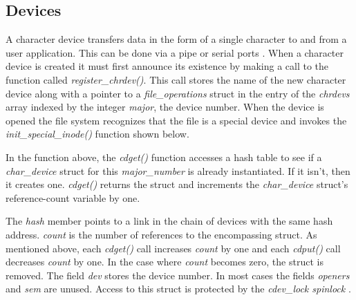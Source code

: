 \documentclass[onecolumn,draftclsnofoot, 10pt, compsoc]{IEEEtran}
\begin{document}
	\subsection{Devices}
	A character device transfers data in the form of a single character to and from a user application. 
	This can be done via a pipe or serial ports \cite{deviceLinuxMolly}. 
	When a character device is created it must first announce its existence by making a call to the function called \textit{register\_chrdev()}. 
	This call stores the name of the new character device along with a pointer to a \textit{file\_operations} struct in the entry of the \textit{chrdevs} array indexed by the integer \textit{major}, the device number. 
	When the device is opened the file system recognizes that the file is a special device and invokes the \textit{init\_special\_inode()} function shown below.
	
	
	
	In the function above, the \textit{cdget()} function accesses a hash table to see if a \textit{char\_device} struct for this \textit{major\_number} is already instantiated. 
	If it isn't, then it creates one. \textit{cdget()} returns the struct and increments the \textit{char\_device} struct's reference-count variable by one.
	
	
	
	The  \textit{hash} member points to a link in the chain of devices with the same hash address.
	\textit{count} is the number of references to the encompassing struct.
	As mentioned above, each \textit{cdget()} call increases \textit{count} by one and each\textit{ cdput()} call decreases \textit{count} by one. In the case where \textit{count} becomes zero, the struct is removed. 
	The field \textit{dev} stores the device number. 
	In most cases the fields \textit{openers} and \textit{sem} are unused.
	Access to this struct is protected by the \textit{cdev\_lock spinlock} \cite{implLinuxChar}.	
	
\end{document}
